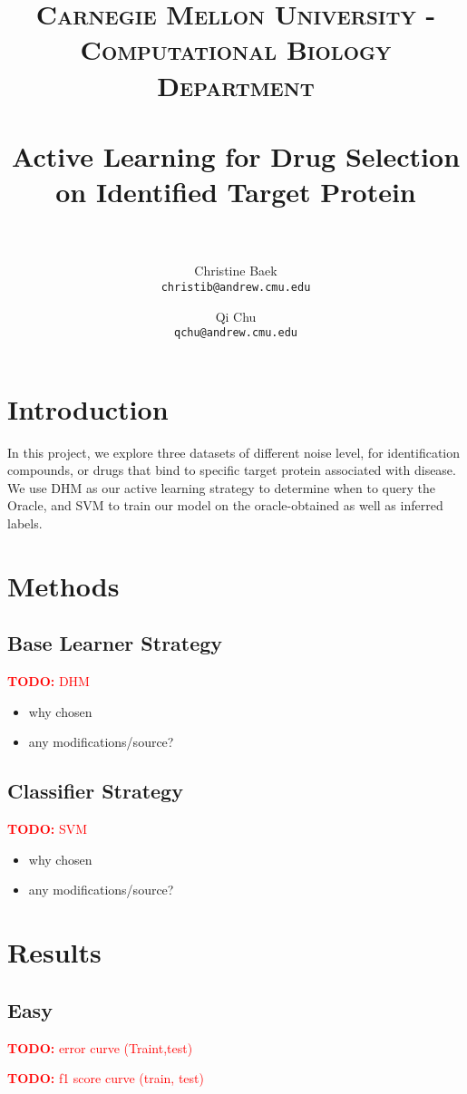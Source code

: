 \documentclass[paper=a4, fontsize=11pt]{scrartcl}
\title{
		\usefont{OT1}{bch}{b}{n}
		\normalfont \normalsize \textsc{Carnegie Mellon University - Computational Biology Department} \\ [25pt]
		\horrule{0.5pt} \\[0.4cm]
		\huge Active Learning for Drug Selection\\ on Identified Target Protein \\
		\horrule{2pt} \\[0.5cm]
}
\author{
  Christine Baek\\
  \normalsize\texttt{christib@andrew.cmu.edu}
  \and
  Qi Chu\\
  \normalsize\texttt{qchu@andrew.cmu.edu}
}
\date{}
\newcommand{\TODO}[1]{\textcolor{red}{\textbf{TODO: } #1}}
\numberwithin{equation}{section}		%
\numberwithin{figure}{section}			%
\numberwithin{table}{section}				%
\begin{document}
\maketitle
\section{Introduction}

In this project, we explore three datasets of different noise level, for identification compounds, or drugs that bind to specific target protein associated with disease. We use DHM as our active learning strategy to determine when to query the Oracle, and SVM to train our model on the oracle-obtained as well as inferred labels. 

\section{Methods}

\subsection{Base Learner Strategy}

\TODO{DHM}
\begin{itemize}
\item why chosen
\item any modifications/source?
\end{itemize}

\subsection{Classifier Strategy}

\TODO{SVM}
\begin{itemize}
\item why chosen
\item any modifications/source?
\end{itemize}

\section{Results}

\subsection{Easy}


\TODO{error curve (Traint,test)}

\TODO{f1 score curve (train, test)}
\end{document}
